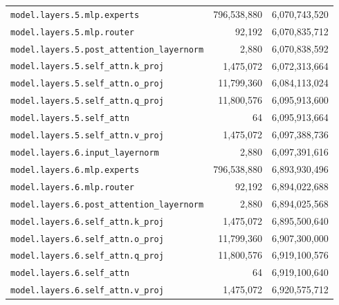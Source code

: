 \documentclass[10pt,a4paper]{article}
\theoremstyle{definition}
\begin{document}
\begin{appendices}
\begin{longtable}{p{9.5cm}rr}
\texttt{model.\allowbreak{}layers.\allowbreak{}5.\allowbreak{}mlp.\allowbreak{}experts} & 796,538,880 & 6,070,743,520 \\
\texttt{model.\allowbreak{}layers.\allowbreak{}5.\allowbreak{}mlp.\allowbreak{}router} & 92,192 & 6,070,835,712 \\
\texttt{model.\allowbreak{}layers.\allowbreak{}5.\allowbreak{}post\_attention\_layernorm} & 2,880 & 6,070,838,592 \\
\texttt{model.\allowbreak{}layers.\allowbreak{}5.\allowbreak{}self\_attn.\allowbreak{}k\_proj} & 1,475,072 & 6,072,313,664 \\
\texttt{model.\allowbreak{}layers.\allowbreak{}5.\allowbreak{}self\_attn.\allowbreak{}o\_proj} & 11,799,360 & 6,084,113,024 \\
\texttt{model.\allowbreak{}layers.\allowbreak{}5.\allowbreak{}self\_attn.\allowbreak{}q\_proj} & 11,800,576 & 6,095,913,600 \\
\texttt{model.\allowbreak{}layers.\allowbreak{}5.\allowbreak{}self\_attn} & 64 & 6,095,913,664 \\
\texttt{model.\allowbreak{}layers.\allowbreak{}5.\allowbreak{}self\_attn.\allowbreak{}v\_proj} & 1,475,072 & 6,097,388,736 \\
\texttt{model.\allowbreak{}layers.\allowbreak{}6.\allowbreak{}input\_layernorm} & 2,880 & 6,097,391,616 \\
\texttt{model.\allowbreak{}layers.\allowbreak{}6.\allowbreak{}mlp.\allowbreak{}experts} & 796,538,880 & 6,893,930,496 \\
\texttt{model.\allowbreak{}layers.\allowbreak{}6.\allowbreak{}mlp.\allowbreak{}router} & 92,192 & 6,894,022,688 \\
\texttt{model.\allowbreak{}layers.\allowbreak{}6.\allowbreak{}post\_attention\_layernorm} & 2,880 & 6,894,025,568 \\
\texttt{model.\allowbreak{}layers.\allowbreak{}6.\allowbreak{}self\_attn.\allowbreak{}k\_proj} & 1,475,072 & 6,895,500,640 \\
\texttt{model.\allowbreak{}layers.\allowbreak{}6.\allowbreak{}self\_attn.\allowbreak{}o\_proj} & 11,799,360 & 6,907,300,000 \\
\texttt{model.\allowbreak{}layers.\allowbreak{}6.\allowbreak{}self\_attn.\allowbreak{}q\_proj} & 11,800,576 & 6,919,100,576 \\
\texttt{model.\allowbreak{}layers.\allowbreak{}6.\allowbreak{}self\_attn} & 64 & 6,919,100,640 \\
\texttt{model.\allowbreak{}layers.\allowbreak{}6.\allowbreak{}self\_attn.\allowbreak{}v\_proj} & 1,475,072 & 6,920,575,712 \\

\end{longtable}
\end{appendices}
\end{document}
